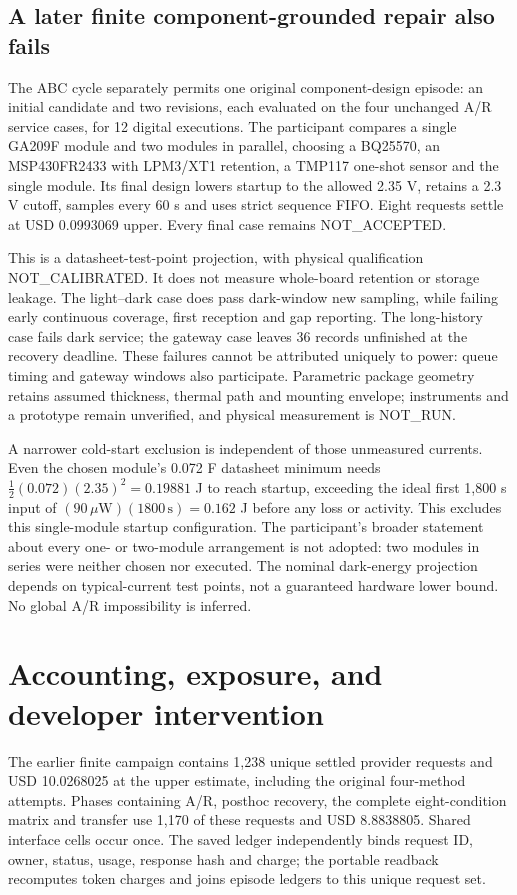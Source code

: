 \subsection{A later finite component-grounded repair also fails}
The ABC cycle separately permits one original component-design episode: an
initial candidate and two revisions, each evaluated on the four unchanged A/R
service cases, for 12 digital executions. The participant compares a single
GA209F module and two modules in parallel, choosing a BQ25570, an
MSP430FR2433 with LPM3/XT1 retention, a TMP117 one-shot sensor and the single
module. Its final design lowers startup to the allowed 2.35 V, retains a 2.3 V
cutoff, samples every 60 s and uses strict sequence FIFO. Eight requests settle
at USD 0.0993069 upper. Every final case remains NOT\_ACCEPTED.

This is a datasheet-test-point projection, with physical qualification
NOT\_CALIBRATED. It does not measure whole-board retention or storage leakage.
The light--dark case does pass dark-window new sampling, while failing early
continuous coverage, first reception and gap reporting. The long-history case
fails dark service; the gateway case leaves 36 records unfinished at the recovery
deadline. These failures cannot be attributed uniquely to power: queue timing
and gateway windows also participate. Parametric package geometry retains
assumed thickness, thermal path and mounting envelope; instruments and a
prototype remain unverified, and physical measurement is NOT\_RUN.

A narrower cold-start exclusion is independent of those unmeasured currents.
Even the chosen module's 0.072 F datasheet minimum needs
$\tfrac12(0.072)(2.35)^2=0.19881$ J to reach startup, exceeding the ideal first
1,800 s input of $(90\,\mu\mathrm{W})(1800\,\mathrm{s})=0.162$ J before any
loss or activity. This excludes this single-module startup configuration.
The participant's broader statement about every one- or two-module arrangement
is not adopted: two modules in series were neither chosen nor executed.
The nominal dark-energy projection depends on typical-current test points,
not a guaranteed hardware lower bound. No global A/R impossibility is inferred.

\section{Accounting, exposure, and developer intervention}

The earlier finite campaign contains 1,238 unique settled provider requests and
USD 10.0268025 at the upper estimate, including the original four-method
attempts. Phases containing A/R, posthoc recovery, the complete eight-condition
matrix and transfer use 1,170 of these requests and USD 8.8838805. Shared
interface cells occur once. The saved ledger independently binds request ID,
owner, status, usage, response hash and charge; the portable readback recomputes
token charges and joins episode ledgers to this unique request set.

